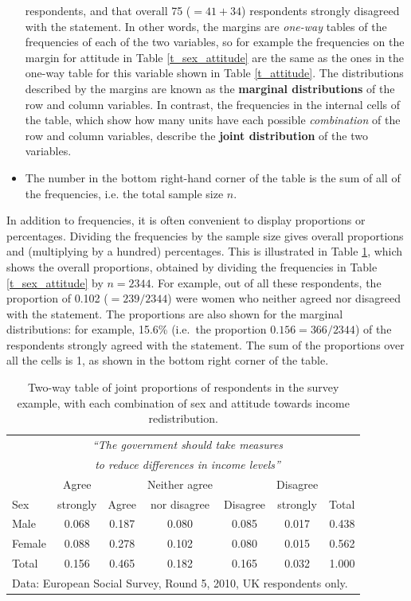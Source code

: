 \begin{itemize}
respondents, and that overall 75 ($=41+34$) respondents strongly
disagreed with the statement. In other words, the margins are
\emph{one-way} tables of the frequencies of each of the two variables,
so for example the frequencies on the margin for attitude
in Table \ref{t_sex_attitude} are the same as the ones in the one-way
table for this variable shown in Table \ref{t_attitude}.
The distributions described by the margins
are known as the \textbf{marginal distributions} of the row and column
variables. In contrast, the frequencies in the internal cells of the
table, which show how many units have each possible
\emph{combination} of the row and column variables, describe the \textbf{joint
distribution} of the two variables.
\item
The number in the bottom
right-hand corner of the table is the sum of all of the frequencies,
i.e. the total sample size $n$.
\end{itemize}

In addition to frequencies, it is often convenient to display
proportions or percentages. Dividing the frequencies by the sample size
gives overall proportions and (multiplying by a hundred) percentages.
This is illustrated in Table \ref{t_sex_attitude_pr}, which shows the
overall proportions, obtained by dividing the frequencies in Table
\ref{t_sex_attitude} by $n=2344$. For example,
out of all these
respondents, the proportion of 0.102 ($=239/2344$)
were women who neither agreed nor disagreed
with the statement. The proportions are also
shown for the marginal distributions: for example, 15.6\% (i.e.\ the
proportion $0.156=366/2344$) of the respondents strongly agreed with the
statement. The sum of the proportions over all the cells is 1, as shown
in the bottom right corner of the table.

\begin{table}
\caption{Two-way table of joint proportions of respondents in the survey example,
with each combination of sex and attitude towards income redistribution.}
\label{t_sex_attitude_pr}
\begin{center}
\begin{tabular}{|l|ccccc|r|}\hline
& \multicolumn{5}{|c|}{\emph{``The government should
take measures}} & \\
& \multicolumn{5}{|c|}{\emph{to reduce differences in income levels''}}
& \\[.3ex]
 & Agree & & Neither agree & & Disagree & \\
Sex & strongly & Agree & nor disagree & Disagree & strongly & Total \\ \hline
Male &  0.068& 0.187 & 0.080 &0.085  & 0.017& 0.438 \\
Female & 0.088 & 0.278 & 0.102 & 0.080 & 0.015 & 0.562\\
\hline
Total & 0.156 & 0.465 & 0.182 & 0.165& 0.032 & 1.000 \\
\hline
\multicolumn{7}{l}{\scriptsize Data: European Social Survey, Round 5,
2010, UK respondents only.}
\end{tabular}
\end{center}
\vspace*{-3ex}
\end{table}

